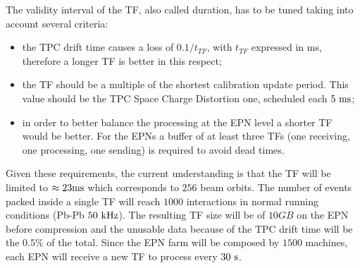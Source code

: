 The validity interval of the TF, also called duration, has to be tuned taking into account several criteria:
\begin{itemize}
    \item the TPC drift time causes a loss of $0.1/t_{TF}$, with $t_{TF}$ expressed in ms, therefore a longer TF is better in this respect;
    \item the TF should be a multiple of the shortest calibration update period. This value should be the TPC Space Charge Distortion one, scheduled each $5\ \rm ms$;
    \item in order to better balance the processing at the EPN level a shorter TF would be better. For the EPNs a buffer of at least three TFs (one receiving, one processing, one sending) is required to avoid dead times.
\end{itemize}
Given these requirements, the current understanding is that the TF will be limited to $\approx23 \rm ms$ which corresponds to $256$ beam orbits.
The number of events packed inside a single TF will reach $1000$ interactions in normal running conditions (Pb-Pb $50\ \rm kHz$).
The resulting TF size will be of $10GB$ on the EPN before compression and the unusable data because of the TPC drift time will be the $0.5\%$ of the total.
Since the EPN farm will be composed by $1500$ machines, each EPN will receive a new TF to process every $30\ \rm s$.

